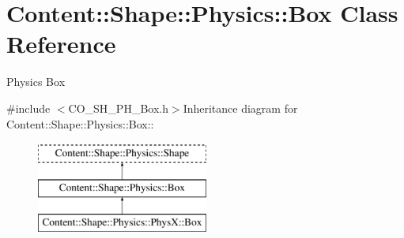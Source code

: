 \hypertarget{classContent_1_1Shape_1_1Physics_1_1Box}{
\section{Content::Shape::Physics::Box Class Reference}
\label{classContent_1_1Shape_1_1Physics_1_1Box}
}


Physics Box  


{\ttfamily \#include $<$CO\_\-SH\_\-PH\_\-Box.h$>$}Inheritance diagram for Content::Shape::Physics::Box::\begin{figure}[H]
\begin{center}
\leavevmode
\includegraphics[height=3cm]{classContent_1_1Shape_1_1Physics_1_1Box}
\end{center}
\end{figure}
